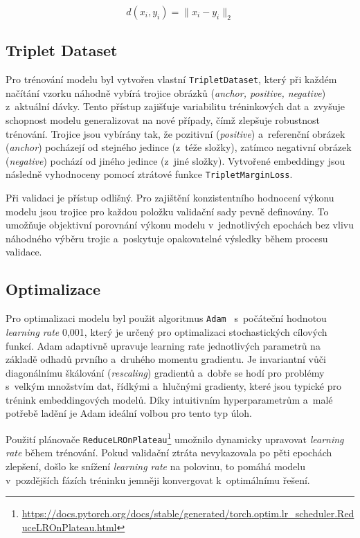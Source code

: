 \begin{equation}
	d(x_i, y_i) = \|x_i - y_i\|_2
	\label{distance}
\end{equation}

\subsection*{Triplet Dataset}
Pro trénování modelu byl vytvořen vlastní \texttt{TripletDataset}, který při každém načítání vzorku náhodně vybírá trojice obrázků (\textit{anchor, positive, negative}) z~aktuální dávky. Tento přístup zajišťuje variabilitu tréninkových dat a~zvyšuje schopnost modelu generalizovat na nové případy, čímž zlepšuje robustnost trénování. Trojice jsou vybírány tak, že pozitivní (\textit{positive}) a~referenční obrázek (\textit{anchor}) pocházejí od stejného jedince (z~téže složky), zatímco negativní obrázek (\textit{negative}) pochází od jiného jedince (z~jiné složky). Vytvořené embeddingy jsou následně vyhodnoceny pomocí ztrátové funkce \texttt{TripletMarginLoss}.

Při validaci je přístup odlišný. Pro zajištění konzistentního hodnocení výkonu modelu jsou trojice pro každou položku validační sady pevně definovány. To umožňuje objektivní porovnání výkonu modelu v~jednotlivých epochách bez vlivu náhodného výběru trojic a~poskytuje opakovatelné výsledky během procesu validace.

\subsection*{Optimalizace}

Pro optimalizaci modelu byl použit algoritmus \texttt{Adam}~\cite{adam} s~počáteční hodnotou \textit{learning rate} 0,001, který je určený pro optimalizaci stochastických cílových funkcí. Adam adaptivně upravuje learning rate jednotlivých parametrů na základě odhadů prvního a~druhého momentu gradientu. Je invariantní vůči diagonálnímu škálování (\textit{rescaling}) gradientů a~dobře se hodí pro problémy s~velkým množstvím dat, řídkými a~hlučnými gradienty, které jsou typické pro trénink embeddingových modelů. Díky intuitivním hyperparametrům a~malé potřebě ladění je Adam ideální volbou pro tento typ úloh.

 Použití plánovače \texttt{ReduceLROnPlateau}\footnote{\url{https://docs.pytorch.org/docs/stable/generated/torch.optim.lr_scheduler.ReduceLROnPlateau.html}} umožnilo dynamicky upravovat \textit{learning rate} během trénování. Pokud validační ztráta nevykazovala po pěti epochách zlepšení, došlo ke snížení \textit{learning rate} na polovinu, to pomáhá modelu v~pozdějších fázích tréninku jemněji konvergovat k~optimálnímu řešení.

